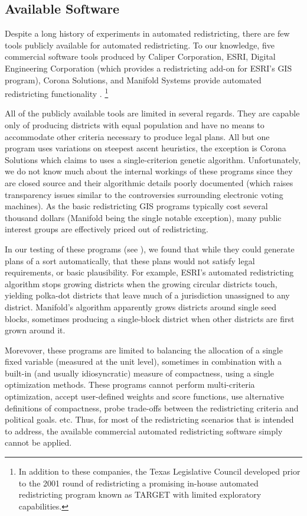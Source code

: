 \documentclass[article]{JSSstyle/jss}
\begin{document}
\subsection{Available Software}

Despite a long history of experiments in automated redistricting, 
there are few tools publicly available for automated redistricting. 
To our knowledge, five commercial software tools produced by Caliper 
Corporation, ESRI, Digital Engineering Corporation (which provides 
a redistricting add-on for ESRI's GIS program), Corona Solutions, 
and Manifold Systems provide automated redistricting functionality 
\citep[][]{AltMacMcD05}.  \footnote{In addition to these companies, 
the Texas Legislative Council developed prior to the 2001 round of redistricting a promising in-house 
automated redistricting program known as TARGET with limited exploratory
capabilities.}   

All of the publicly available tools are limited in several regards.  
They are capable only of producing districts with equal 
population and have no means to accommodate other criteria necessary 
to produce legal plans.  All but one program uses variations on 
steepest ascent heuristics, the exception is Corona Solutions which 
claims to uses a single-criterion genetic algorithm.  Unfortunately, 
we do not know much about the internal workings of these programs since they are 
closed source and their algorithmic details poorly documented 
(which raises transparency issues similar to the controversies surrounding 
electronic voting machines).  As the basic redistricting GIS programs typically 
cost several thousand dollars (Manifold being the single notable exception), 
many public interest groups are effectively priced out of redistricting.  

In our testing of these programs (see \citet{AltMacMcD05}), we found that while they could generate plans of a sort automatically,  that these plans would not satisfy legal requirements, or basic plausibility. 
For example, ESRI's automated redistricting algorithm stops growing districts when the growing circular districts touch, yielding polka-dot districts that leave much of a jurisdiction unassigned to any district.  Manifold's algorithm apparently grows districts around single seed blocks, sometimes producing a single-block district when other districts are first grown around it. 

Morevover, these programs are limited to balancing the allocation of  a single fixed variable (measured at the unit level), sometimes in combination with a built-in  (and usually idiosyncratic) measure of compactness, using a single optimization methods. These programs cannot perform multi-criteria optimization, accept user-defined weights and score functions, use alternative definitions of compactness, probe trade-offs between the redistricting criteria and political goals. etc. Thus, for most of the redistricting scenarios that  is intended to address, the available commercial automated redistricting software simply cannot be applied.
\end{document}
